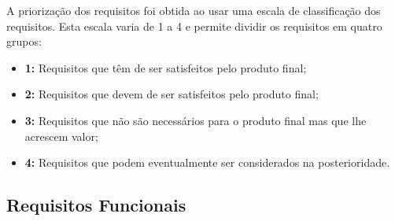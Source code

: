 \documentclass[11pt,a4paper]{article}
\begin{document}
\begin{appendices}
A priorização dos requisitos foi obtida ao usar uma escala de classificação dos requisitos. Esta escala varia de 1 a 4 e permite dividir os requisitos em quatro grupos:
\begin{itemize}
    \item \textbf{1:} Requisitos que têm de ser satisfeitos pelo produto final;
    \item \textbf{2:} Requisitos que devem de ser satisfeitos pelo produto final;
    \item \textbf{3:} Requisitos que não são necessários para o produto final mas que lhe acrescem valor;
    \item \textbf{4:} Requisitos que podem eventualmente ser considerados na posterioridade.
\end{itemize}

\subsection{Requisitos Funcionais}

\end{appendices}
\end{document}
